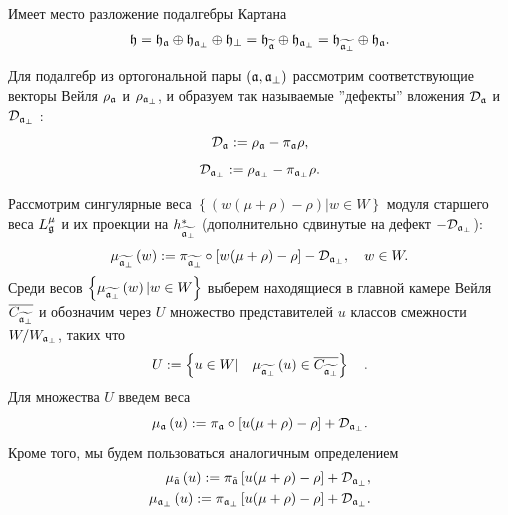 Имеет место разложение подалгебры Картана
\begin{equation}
\mathfrak{h}=\frak{\mathfrak{h}_{\mathfrak{a}}}\oplus \mathfrak{h}_{\mathfrak{a}_{\perp}}\oplus
\mathfrak{h}_{\perp }=\frak{\mathfrak{h}_{\widetilde{\mathfrak{a}}}}\oplus \mathfrak{h}_{\mathfrak{a}_{\perp}}=\frak{\mathfrak{h}_{\widetilde{\mathfrak{a}_{\perp}}}}\oplus
\mathfrak{h}_{\mathfrak{a}}.
\end{equation}

Для подалгебр из ортогональной пары  $\left( \mathfrak{a},\mathfrak{a}_{\perp}\right) $ рассмотрим соответствующие векторы Вейля $\rho _{\mathfrak{a}}$ и $\rho _{\mathfrak{a}_{\perp }}$, и образуем так называемые  ''дефекты'' вложения $\mathcal{D}_{\mathfrak{a}}$ и $\mathcal{D}_{\mathfrak{a}_{\perp }}$ :
\begin{equation}
\mathcal{D}_{\mathfrak{a}}:=\rho _{\mathfrak{a}}-\pi _{\mathfrak{a}}\rho ,
\end{equation}
\begin{equation}
\label{defect-perp}
\mathcal{D}_{\mathfrak{a}_{\perp }}:=\rho _{\mathfrak{a}_{\perp }}-\pi_{\mathfrak{a}_{\perp}}\rho .
\end{equation}

Рассмотрим сингулярные веса  $\left\{\left( w(\mu +\rho )-\rho \right)|w  \in W \right\}$  модуля старшего веса  $L_{\mathfrak{g}}^{\mu }$ и их проекции на $h_{\widetilde{\mathfrak{a}_{\perp }}}^{\ast }$ (дополнительно сдвинутые на дефект $-\mathcal{D}_{\mathfrak{a}_{\perp }}$):
\begin{equation*}
\mu _{\widetilde{\af_{\perp }}}\left( w\right) :=\pi _{\widetilde{\frak{%
a}_{\perp }}}\circ\left[ w(\mu +\rho )-\rho \right] -\mathcal{D}_{\af_{\perp
}},\quad w\in W.
\end{equation*}
Среди весов  $\left\{\mu _{\widetilde{\mathfrak{a}_{\perp }}}\left( w\right)|w\in W\right\}$ выберем находящиеся в главной камере Вейля $\overline{C_{\widetilde{\mathfrak{a}_{\perp}}}}$ и обозначим через $U$ множество представителей $u$ классов смежности $W/W_{\mathfrak{a}_{\perp }}$, таких что
\begin{equation}
U:=\left\{ u\in W|\quad \mu _{\widetilde{\mathfrak{a}_{\perp }}}\left( u\right)
\in \overline{C_{\widetilde{\mathfrak{a}_{\perp }}}}\right\} \quad .
\label{U-def}
\end{equation}
Для множества  $U$ введем веса
\begin{equation*}
\mu _{\af}\left( u\right) :=\pi _{\af}\circ\left[ u(\mu +\rho )-\rho %
\right] +\mathcal{D}_{\af_{\perp }}.
\end{equation*}
Кроме того, мы будем пользоваться аналогичным определением
\begin{eqnarray}
\label{eq:136}
\mu _{\tilde {\mathfrak{a}}}\left( u\right) :=\pi _{\tilde {\mathfrak{a}}}\left[ u(\mu +\rho )-\rho \right] +\mathcal{D}_{\mathfrak{a}_{\perp}},\\
\mu _{\mathfrak{a}_{\perp}}\left( u\right) :=\pi _{\mathfrak{a}_{\perp}}\left[ u(\mu +\rho )-\rho \right] +\mathcal{D}_{\mathfrak{a}_{\perp}}.
\end{eqnarray}

